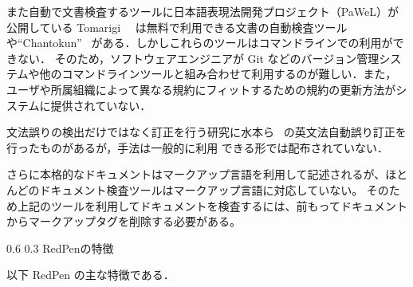 \documentclass[a4j,twocolumn]{jarticle}
\makeatletter
\def\section{\@startsection{section}{1}{\z@}%
   {0.6\Cvs}%
   {0.3\Cvs}%
   {\reset@font\fontsize{10.5pt}{0pt}\bfseries}}
\makeatother
\begin{document}
また自動で文書検査するツールに日本語表現法開発プロジェクト（PaWeL）が公開している Tomarigi~\cite{tomarigi}~\cite{tomarigi-paper}
は無料で利用できる文書の自動検査ツールや``Chantokun''~\cite{chantokun} がある．しかしこれらのツールはコマンドラインでの利用ができない．
そのため，ソフトウェアエンジニアが Git などのバージョン管理システムや他のコマンドラインツールと組み合わせて利用するのが難しい．また，
ユーザや所属組織によって異なる規約にフィットするための規約の更新方法がシステムに提供されていない． 

文法誤りの検出だけではなく訂正を行う研究に水本ら~\cite{mizumoto12english} の英文法自動誤り訂正を行ったものがあるが，手法は一般的に利用
できる形では配布されていない．

さらに本格的なドキュメントはマークアップ言語を利用して記述されるが、ほとんどのドキュメント検査ツールはマークアップ言語に対応していない。
そのため上記のツールを利用してドキュメントを検査するには、前もってドキュメントからマークアップタグを削除する必要がある。

\section{RedPenの特徴}

以下 RedPen の主な特徴である．
\end{document}
